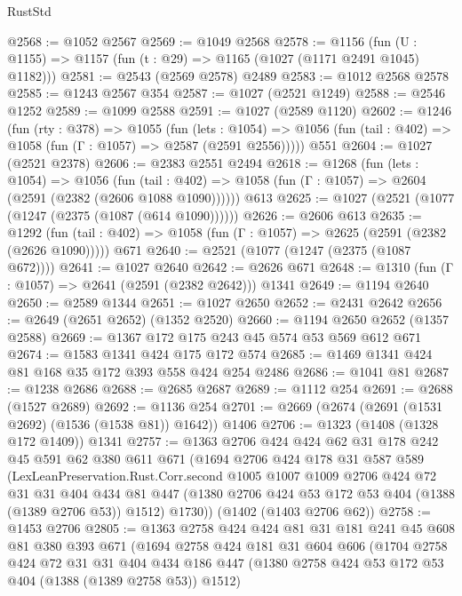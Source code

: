 \begin{lexlean}{RustStd}
\begin{coremodule}
@2568 := @1052 @2567
@2569 := @1049 @2568
@2578 := @1156 (fun (U : @1155) => @1157 (fun (t : @29) => @1165 (@1027 (@1171 @2491 @1045) @1182)))
@2581 := @2543 (@2569 @2578) @2489
@2583 := @1012 @2568 @2578
@2585 := @1243 @2567 @354
@2587 := @1027 (@2521 @1249)
@2588 := @2546 @1252
@2589 := @1099 @2588
@2591 := @1027 (@2589 @1120)
@2602 := @1246
    (fun (rty : @378) =>
    @1055
      (fun (lets : @1054) =>
      @1056 (fun (tail : @402) => @1058 (fun (Γ : @1057) => @2587 (@2591 @2556)))))
    @551
@2604 := @1027 (@2521 @2378)
@2606 := @2383 @2551 @2494
@2618 := @1268
    (fun (lets : @1054) =>
    @1056
      (fun (tail : @402) => @1058 (fun (Γ : @1057) => @2604 (@2591 (@2382 (@2606 @1088 @1090))))))
    @613
@2625 := @1027 (@2521 (@1077 (@1247 (@2375 (@1087 (@614 @1090))))))
@2626 := @2606 @613
@2635 := @1292
    (fun (tail : @402) => @1058 (fun (Γ : @1057) => @2625 (@2591 (@2382 (@2626 @1090)))))
    @671
@2640 := @2521 (@1077 (@1247 (@2375 (@1087 @672))))
@2641 := @1027 @2640
@2642 := @2626 @671
@2648 := @1310 (fun (Γ : @1057) => @2641 (@2591 (@2382 @2642))) @1341
@2649 := @1194 @2640
@2650 := @2589 @1344
@2651 := @1027 @2650
@2652 := @2431 @2642
@2656 := @2649 (@2651 @2652) (@1352 @2520)
@2660 := @1194 @2650 @2652 (@1357 @2588)
@2669 := @1367 @172 @175 @243 @45 @574 @53 @569 @612 @671
@2674 := @1583 @1341 @424 @175 @172 @574
@2685 := @1469 @1341 @424 @81 @168 @35 @172 @393 @558 @424 @254 @2486
@2686 := @1041 @81
@2687 := @1238 @2686
@2688 := @2685 @2687
@2689 := @1112 @254
@2691 := @2688 (@1527 @2689)
@2692 := @1136 @254
@2701 := @2669 (@2674 (@2691 (@1531 @2692) (@1536 (@1538 @81)) @1642)) @1406
@2706 := @1323 (@1408 (@1328 @172 @1409)) @1341
@2757 := @1363
    @2706
    @424
    @424
    @62
    @31
    @178
    @242
    @45
    @591
    @62
    @380
    @611
    @671
    (@1694
      @2706
      @424
      @178
      @31
      @587
      @589
      (LexLeanPreservation.Rust.Corr.second
        @1005
        @1007
        @1009
        @2706
        @424
        @72
        @31
        @31
        @404
        @434
        @81
        @447
        (@1380 @2706 @424 @53 @172 @53 @404 (@1388 (@1389 @2706 @53)) @1512)
        @1730))
    (@1402 (@1403 @2706 @62))
@2758 := @1453 @2706
@2805 := @1363
    @2758
    @424
    @424
    @81
    @31
    @181
    @241
    @45
    @608
    @81
    @380
    @393
    @671
    (@1694
      @2758
      @424
      @181
      @31
      @604
      @606
      (@1704
        @2758
        @424
        @72
        @31
        @31
        @404
        @434
        @186
        @447
        (@1380 @2758 @424 @53 @172 @53 @404 (@1388 (@1389 @2758 @53)) @1512)

\end{coremodule}
\end{lexlean}

